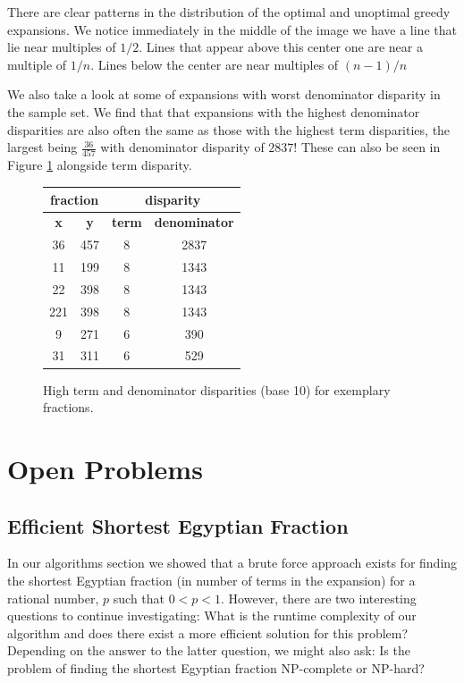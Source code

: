\documentclass[paper=a4, fontsize=11pt]{scrartcl}
\numberwithin{equation}{section}	 %
\numberwithin{figure}{section}	 %
\numberwithin{table}{section}	 %
\begin{document}
There are clear patterns in the distribution of the optimal and unoptimal greedy expansions. We notice immediately in the middle of the image we have a line that lie near multiples of $1/2$. Lines that appear above this center one are near a multiple of $1/n$. Lines below the center are near multiples of $(n-1)/n$

We also take a look at some of expansions with worst denominator disparity in the sample set. We find that that expansions with the highest denominator disparities are also often the same as those with the highest term disparities, the largest being $\frac{36}{457}$ with denominator disparity of $2837$! These can also be seen in Figure \ref{fig:disparity} alongside term disparity.

\begin{figure}[t]
\centering
\begin{tabular}{|c|c|c|c|}
    \hline
    \multicolumn{2}{|c|}{\textbf{fraction}} & \multicolumn{2}{|c|}{\textbf{disparity}} \\ \hline
	\textbf{x} & \textbf{y} & \textbf{term} & \textbf{denominator} \\ \hline\hline
	36 & 457 & 8 & 2837 \\ \hline
	11 & 199 & 8 & 1343 \\ \hline
    22 & 398 & 8 & 1343 \\ \hline
    221 & 398 & 8 & 1343 \\ \hline
    9 & 271 & 6 & 390 \\ \hline
    31 & 311 & 6 & 529 \\ \hline
\end{tabular}
\caption{High term and denominator disparities (base 10) for exemplary fractions.}
\label{fig:disparity}
\end{figure}
 
\section{Open Problems}
\subsection{Efficient Shortest Egyptian Fraction}

In our algorithms section we showed that a brute force approach exists for finding the shortest Egyptian fraction (in number of terms in the expansion) for a rational number, $p$ such that $0 < p < 1$. However, there are two interesting questions to continue investigating: What is the runtime complexity of our algorithm and does there exist a more efficient solution for this problem? Depending on the answer to the latter question, we might also ask: Is the problem of finding the shortest Egyptian fraction NP-complete or NP-hard?
\end{document}
